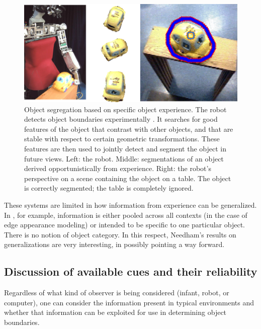 \begin{figure}[t]

\centerline{
\includegraphics[width=0.75\columnwidth]{fig-robot}
}

\caption{
%
Object segregation based on specific object experience.  The robot
detects object boundaries experimentally \cite{fitzpatrick03object}.
It searches for good features of the object that contrast with other
objects, and that are stable with respect to certain geometric
transformations.  These features are then used to jointly detect
and segment the object in future views.  Left: the robot.
Middle: segmentations of an object derived opportunistically
from experience.  Right: the robot's perspective on a scene 
containing the object on a table.  The object is correctly segmented;
the table is completely ignored.
%
}

\label{fig:robot}

\end{figure}



These systems are limited in how information from experience can be
generalized.  In , for example,
information is either pooled across all contexts (in the case of edge
appearance modeling) or intended to be specific to one particular
object.  There is no notion of object category.
%
In this respect, Needham's results on generalizations are
very interesting, in possibly pointing a way forward.


\subsection{Discussion of available cues and their reliability}

Regardless of what kind of observer is being considered (infant,
robot, or computer), one can consider the information present
in typical environments and whether that information can be
exploited for use in determining object boundaries.


